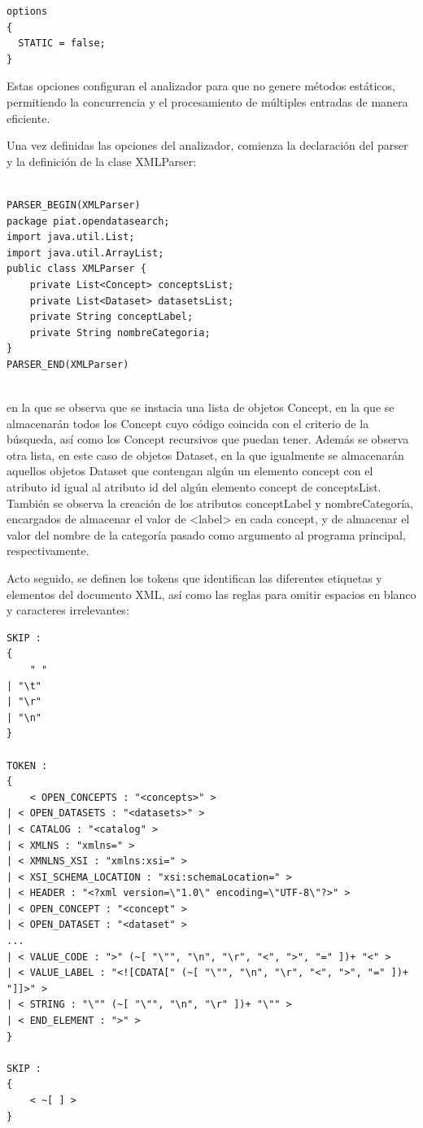 \lstset{inputencoding=utf8/latin1}
\begin{lstlisting}
options
{
  STATIC = false;
}
\end{lstlisting}

Estas opciones configuran el analizador para que no genere métodos estáticos, permitiendo la concurrencia y el procesamiento de múltiples entradas de manera eficiente.

Una vez definidas las opciones del analizador, comienza la declaración del parser y la definición de la clase XMLParser:

\lstset{inputencoding=utf8/latin1}
\begin{lstlisting}
    
PARSER_BEGIN(XMLParser)
package piat.opendatasearch;
import java.util.List;
import java.util.ArrayList;
public class XMLParser {
    private List<Concept> conceptsList;
    private List<Dataset> datasetsList;
    private String conceptLabel;
    private String nombreCategoria;
}
PARSER_END(XMLParser)
    
\end{lstlisting}

en la que se observa que se instacia una lista de objetos Concept, en la que se almacenarán todos los Concept cuyo código coincida con el criterio de la búsqueda, así como los Concept recursivos que puedan tener.
Además se observa otra lista, en este caso de objetos Dataset, en la que igualmente se almacenarán aquellos objetos Dataset que contengan algún un elemento concept con el atributo id igual al atributo id del algún elemento concept de conceptsList.
También se observa la creación de los atributos conceptLabel y nombreCategoría, encargados de almacenar el valor de <label> en cada concept, y de almacenar el valor del nombre de la categoría pasado como argumento al programa principal, respectivamente.

Acto seguido, se definen los tokens que identifican las diferentes etiquetas y elementos del documento XML, así como las reglas para omitir espacios en blanco y caracteres irrelevantes:

\lstset{inputencoding=utf8/latin1}
\begin{lstlisting}
SKIP :
{
    " "
| "\t"
| "\r"
| "\n"
}

TOKEN :
{
    < OPEN_CONCEPTS : "<concepts>" >
| < OPEN_DATASETS : "<datasets>" >
| < CATALOG : "<catalog" >
| < XMLNS : "xmlns=" >
| < XMNLNS_XSI : "xmlns:xsi=" >
| < XSI_SCHEMA_LOCATION : "xsi:schemaLocation=" >
| < HEADER : "<?xml version=\"1.0\" encoding=\"UTF-8\"?>" >
| < OPEN_CONCEPT : "<concept" >
| < OPEN_DATASET : "<dataset" >
...
| < VALUE_CODE : ">" (~[ "\"", "\n", "\r", "<", ">", "=" ])+ "<" >
| < VALUE_LABEL : "<![CDATA[" (~[ "\"", "\n", "\r", "<", ">", "=" ])+ "]]>" >
| < STRING : "\"" (~[ "\"", "\n", "\r" ])+ "\"" >
| < END_ELEMENT : ">" >
}

SKIP :
{
    < ~[ ] >
}
    
\end{lstlisting}

